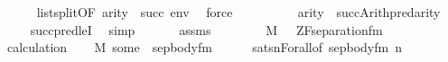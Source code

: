 \begin{isabellebody}
\ \ \ \ \isamarkupfalse%
\ list{\isacharunderscore}{\kern0pt}split{\isacharbrackleft}{\kern0pt}OF\ {\isacartoucheopen}arity{\isacharparenleft}{\kern0pt}{\isasymphi}{\isacharparenright}{\kern0pt}\ {\isasymle}\ succ{\isacharparenleft}{\kern0pt}{\isacharunderscore}{\kern0pt}{\isacharparenright}{\kern0pt}{\isacartoucheclose}\ {\isacartoucheopen}env{\isasymin}{\isacharunderscore}{\kern0pt}{\isacartoucheclose}{\isacharbrackright}{\kern0pt}\ \isamarkupfalse%
\ force\isanewline
\ \ \isamarkupfalse%
\ \isamarkupfalse%
\ {\isacartoucheopen}{\isasymphi}{\isasymin}{\isacharunderscore}{\kern0pt}{\isacartoucheclose}\isanewline
\ \ \isamarkupfalse%
\ {\isachardoublequoteopen}arity{\isacharparenleft}{\kern0pt}{\isasymphi}{\isacharparenright}{\kern0pt}\ {\isasymle}\ succ{\isacharparenleft}{\kern0pt}Arith{\isachardot}{\kern0pt}pred{\isacharparenleft}{\kern0pt}arity{\isacharparenleft}{\kern0pt}{\isasymphi}{\isacharparenright}{\kern0pt}{\isacharparenright}{\kern0pt}{\isacharparenright}{\kern0pt}{\isachardoublequoteclose}\isanewline
\ \ \ \isamarkupfalse%
\ succpred{\isacharunderscore}{\kern0pt}leI\ \isamarkupfalse%
\ simp\isanewline
\ \ \isamarkupfalse%
\isanewline
\ \ \isamarkupfalse%
\ assms\isanewline
\ \ \isamarkupfalse%
\ \isanewline
\ \ \isamarkupfalse%
\ {\isachardoublequoteopen}M{\isacharcomma}{\kern0pt}\ {\isacharbrackleft}{\kern0pt}{\isacharbrackright}{\kern0pt}\ {\isasymTurnstile}\ ZF{\isacharunderscore}{\kern0pt}separation{\isacharunderscore}{\kern0pt}fm{\isacharparenleft}{\kern0pt}{\isasymphi}{\isacharparenright}{\kern0pt}{\isachardoublequoteclose}\ \isanewline
\ \ \isamarkupfalse%
\ \isamarkupfalse%
\ calculation\isanewline
\ \ \isamarkupfalse%
\ {\isachardoublequoteopen}M{\isacharcomma}{\kern0pt}\ some\ {\isasymTurnstile}\ sep{\isacharunderscore}{\kern0pt}body{\isacharunderscore}{\kern0pt}fm{\isacharparenleft}{\kern0pt}{\isasymphi}{\isacharparenright}{\kern0pt}{\isachardoublequoteclose}\isanewline
\ \ \ \ \isamarkupfalse%
\ sats{\isacharunderscore}{\kern0pt}nForall{\isacharbrackleft}{\kern0pt}of\ {\isachardoublequoteopen}sep{\isacharunderscore}{\kern0pt}body{\isacharunderscore}{\kern0pt}fm{\isacharparenleft}{\kern0pt}{\isasymphi}{\isacharparenright}{\kern0pt}{\isachardoublequoteclose}\ {\isacharquery}{\kern0pt}n{\isacharbrackright}{\kern0pt}\isanewline
\ \ \ \ \isamarkupfalse%

\end{isabellebody}
